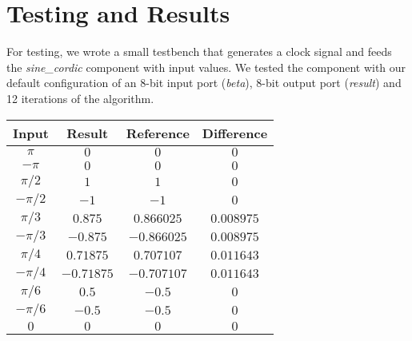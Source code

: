 \section{Testing and Results}

For testing, we wrote a small testbench that generates a clock signal and feeds the \textit{sine\_cordic} component with input values. We tested the component with our default configuration of an 8-bit input port (\textit{beta}), 8-bit output port (\textit{result}) and 12 
iterations of the algorithm.

\begin{center}
	\begin{tabular}{ | c | c | c | c | }
		\hline
		\textbf{Input} & \textbf{Result} & \textbf{Reference} & \textbf{Difference} \\
		\hline
		\(\pi\) & \(0\) & \(0\) & \(0\) \\
		\(-\pi\) & \(0\)  & \(0\) & \(0\) \\
		\(\pi/2\) & \(1\)  & \(1\) & \(0\) \\
		\(-\pi/2\) & \(-1\)  & \(-1\) & \(0\) \\
		\(\pi/3\) & \(0.875\)  & \(0.866025\) & \(0.008975\) \\
		\(-\pi/3\) & \(-0.875\)  & \(-0.866025\) & \(0.008975\) \\
		\(\pi/4\) & \(0.71875\)  & \(0.707107\) & \(0.011643\) \\
		\(-\pi/4\) & \(-0.71875\)  & \(-0.707107\) & \(0.011643\) \\
		\(\pi/6\) & \(0.5\)  & \(-0.5\) & \(0\) \\
		\(-\pi/6\) & \(-0.5\)  & \(-0.5\) & \(0\) \\
		\(0\) & \(0\) & \(0\) & \(0\) \\
		\hline
	\end{tabular} 
\end{center}



  